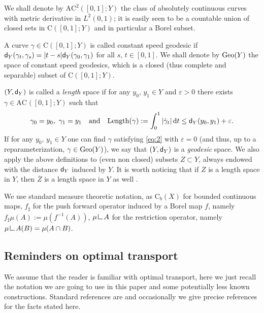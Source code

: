 \documentclass[reqno,11pt]{article}
\numberwithin{equation}{section}
\newcommand{\sfd}{{\sf d}}
\renewcommand{\d}{{\mathrm d}}
\newcommand{\eps}{\varepsilon}
\newcommand{\geo}{{\rm{Geo}}}                       %
\newcommand{\res}{\mathop{\hbox{\vrule height 7pt width .5pt depth 0pt
\vrule height .5pt width 6pt depth 0pt}}\nolimits} %
\newcommand{\AC}[3]{\mathrm{AC}^{#1}(#2;#3)}
\newcommand{\CC}[2]{\mathrm{C}(#1;#2)}
\newcommand{\Cb}{\mathrm C_b}
\begin{document}
We shall denote by $\AC2{[0,1]}Y$ the class of absolutely
continuous curves with metric derivative in $L^2(0,1)$; it is easily
seen to be a countable union of closed sets in $\CC{[0,1]}Y$ and in
particular a Borel subset.

A curve $\gamma\in \CC{[0,1]}Y$ is called constant speed geodesic if
$\sfd_Y(\gamma_t,\gamma_s)=|t-s|\sfd_Y(\gamma_0,\gamma_1)$ for all
$s,\, t\in [0,1]$. We shall denote by $\geo(Y)$ the space of
constant speed geodesics, which is a closed (thus complete and
separable) subset of $\CC{[0,1]}Y$.

$(Y,\sfd_Y)$ is called a \emph{length} space if
for any
$y_0,\,y_1\in Y$ and $\eps>0$ there exists $\gamma\in\AC{}{[0,1]}Y$
such that
\begin{equation}
\gamma_0=y_0,\
\gamma_1=y_1\quad\text{and}\quad
\mathrm{Length}(\gamma):=\int_0^1 |\dot \gamma_t|\,\d t\le
\sfd_Y(y_0,y_1)+\eps.\label{eq:2}
\end{equation}
If for any $y_0,\,y_1\in Y$ one can find $\gamma$ satisfying
\eqref{eq:2} with $\eps=0$ (and thus, up to a reparameterization,
$\gamma\in\geo(Y)$), we say that $(Y,\sfd_Y)$ is a \emph{geodesic}
space. We also apply the above definitions to (even non closed)
subsets $Z\subset Y$, always endowed with the distance $\sfd_Y$
induced by $Y$. It is worth noticing that if $Z$ is a length space
in $Y$, then $\overline Z$ is a length space in $Y$ as well
\cite[Ex.~2.4.18]{Burago-Burago-Ivanov01}.

We use standard measure theoretic notation, as $\Cb(X)$ for bounded
continuous maps, $f_\sharp$ for the push forward operator induced by
a Borel map $f$, namely $f_\sharp \mu(A):=\mu(f^{-1}(A))$, $\mu\res
A$ for the restriction operator, namely $\mu\res A(B)=\mu(A\cap B)$.

\subsection{Reminders on optimal transport}\label{sub2} We assume that the reader
is familiar with optimal transport, here we just recall the notation
we are going to use in this paper and some potentially less known
constructions. Standard references are
\cite{Ambrosio-Gigli11,Ambrosio-Gigli-Savare08,Villani09} and
occasionally we give precise references for the facts stated here.
\end{document}
